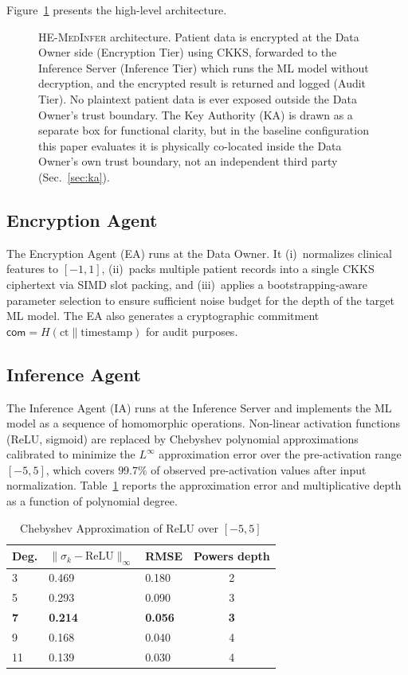 \documentclass[journal,compsoc]{IEEEtran}
\newcommand{\framework}{\textsc{HE-MedInfer}}
\begin{document}
Figure~\ref{fig:overview} presents the high-level architecture.

\begin{figure}[!t]
\centering
\caption{\framework{} architecture. Patient data is encrypted at the Data Owner
side (Encryption Tier) using CKKS, forwarded to the Inference Server (Inference
Tier) which runs the ML model without decryption, and the encrypted result is
returned and logged (Audit Tier). No plaintext patient data is ever exposed
outside the Data Owner's trust boundary. The Key Authority (KA) is drawn as a
separate box for functional clarity, but in the baseline configuration this
paper evaluates it is physically co-located inside the Data Owner's own trust
boundary, not an independent third party (Sec.~\ref{sec:ka}).}
\label{fig:overview}

\end{figure}

\subsection{Encryption Agent}

The Encryption Agent (EA) runs at the Data Owner. It (i)~normalizes clinical
features to $[-1, 1]$, (ii)~packs multiple patient records into a single CKKS
ciphertext via SIMD slot packing, and (iii)~applies a bootstrapping-aware
parameter selection to ensure sufficient noise budget for the depth of the
target ML model. The EA also generates a cryptographic commitment
$\mathsf{com} = H(\mathrm{ct} \| \mathrm{timestamp})$ for audit purposes.

\subsection{Inference Agent}

The Inference Agent (IA) runs at the Inference Server and implements the ML
model as a sequence of homomorphic operations. Non-linear activation functions
(ReLU, sigmoid) are replaced by Chebyshev polynomial approximations calibrated
to minimize the $L^\infty$ approximation error over the pre-activation range
$[-5, 5]$, which covers $99.7\%$ of observed pre-activation values after input
normalization. Table~\ref{tab:cheb} reports the approximation error and
multiplicative depth as a function of polynomial degree.

\begin{table}[!t]
\caption{Chebyshev Approximation of ReLU over $[-5,5]$}
\label{tab:cheb}
\centering
\small
\setlength{\tabcolsep}{4pt}
\begin{tabularx}{\columnwidth}{@{}l X X c@{}}
\toprule
\textbf{Deg.} & $\|\widehat{\sigma}_k - \mathrm{ReLU}\|_\infty$ & \textbf{RMSE} & \textbf{Powers depth} \\
\midrule
3  & 0.469 & 0.180 & 2 \\
5  & 0.293 & 0.090 & 3 \\
\textbf{7}  & \textbf{0.214} & \textbf{0.056} & \textbf{3} \\
9  & 0.168 & 0.040 & 4 \\
11 & 0.139 & 0.030 & 4 \\
\bottomrule
\end{tabularx}
\end{table}
\end{document}
